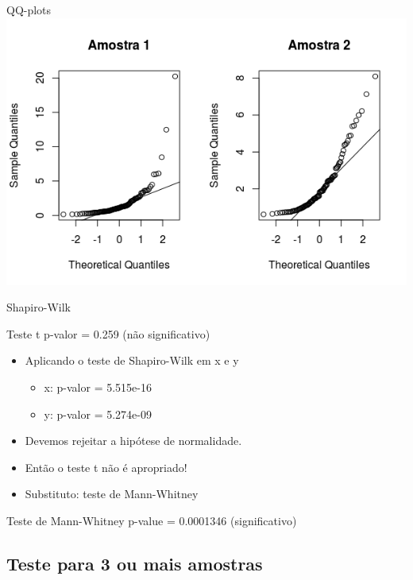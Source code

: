 \documentclass{beamer}
\begin{document}
\begin{frame}{QQ-plots}
 \includegraphics[width=\textwidth]{Nao_Param/2samples-qq}

\end{frame}

\begin{frame}{Shapiro-Wilk}
  \begin{block}{Teste t}
    p-valor = 0.259 (não significativo)
  \end{block}
  \begin{itemize}
  \item<2-> Aplicando o teste de Shapiro-Wilk em x e y
    \begin{itemize}
    \item<2-> x: p-valor = 5.515e-16
    \item<2-> y: p-valor = 5.274e-09
    \end{itemize}
  \item Devemos rejeitar a hipótese de normalidade.
  \item Então o teste t \alert{não é} apropriado!
  \item Substituto: teste de Mann-Whitney
  \end{itemize}
  \begin{block}{Teste de Mann-Whitney}
    p-value = \alert{0.0001346} (significativo)
  \end{block}
\end{frame}

\subsection[3+ amostras]{Teste para 3 ou mais amostras}
\end{document}
